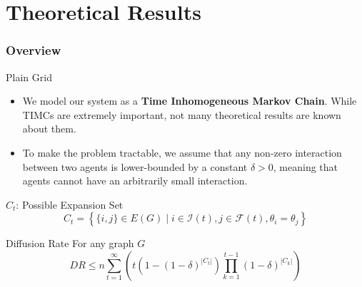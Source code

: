 \documentclass{beamer}
\begin{document}
\section{Theoretical Results}

\begin{frame}
\frametitle{Overview} %
\tableofcontents[currentsection] %
\end{frame}

\begin{frame}{Plain Grid}

\pause
\begin{itemize}
\item We model our system as a \textbf{Time Inhomogeneous Markov Chain}. While TIMCs are extremely important,
not many theoretical results are known about them.
\pause
\item To make the problem tractable, we assume that any non-zero interaction between two agents is lower-bounded
by a constant $\delta > 0$, meaning that agents cannot have an arbitrarily small interaction.
\end{itemize}

\pause
\begin{block}{$C_t$: Possible Expansion Set}
\[
C_t = \left\{ \{i, j\} \in E(G) \mid i \in \mathcal{I}(t), j \in \mathcal{F}(t), \theta_i = \theta_j \right\}
\]
\end{block}

\pause
\begin{block}{Diffusion Rate}
For any graph $G$
\[
DR \leq n \sum_{t = 1}^{\infty} {\left( t \left( 1 - {(1 - \delta)}^{|C_t|} \right) \prod_{k = 1}^{t-1} {{(1 - \delta)}^{|C_k|} } \right) }
\]
\end{block}

\end{frame}
\end{document}
